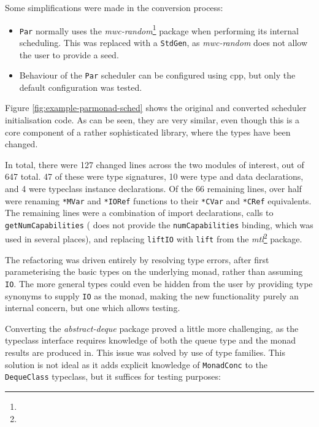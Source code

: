 Some simplifications were made in the conversion process:

\begin{itemize}
\item \verb|Par| normally uses the
  \emph{mwc-random}\footnote{} package when
  performing its internal scheduling. This was replaced with a
  \verb|StdGen|, as \emph{mwc-random} does not allow the user to
  provide a seed.

\item Behaviour of the \verb|Par| scheduler can be configured using
  cpp, but only the default configuration was tested.
\end{itemize}

Figure \ref{fig:example-parmonad-sched} shows the original and
converted scheduler initialisation code. As can be seen, they are very
similar, even though this is a core component of a rather
sophisticated library, where the types have been changed.

In total, there were 127 changed lines across the two modules of
interest, out of 647 total. 47 of these were type signatures, 10 were
type and data declarations, and 4 were typeclass instance
declarations. Of the 66 remaining lines, over half were renaming
\verb|*MVar| and \verb|*IORef| functions to their \verb|*CVar| and
\verb|*CRef| equivalents. The remaining lines were a combination of
import declarations, calls to \verb|getNumCapabilities| (\dejafu{}
does not provide the \verb|numCapabilities| binding, which was used in
several places), and replacing \verb|liftIO| with \verb|lift| from the
\emph{mtl}\footnote{} package.

The refactoring was driven entirely by resolving type errors, after
first parameterising the basic types on the underlying monad, rather
than assuming \verb|IO|. The more general types could even be hidden
from the user by providing type synonyms to supply \verb|IO| as the
monad, making the new functionality purely an internal concern, but
one which allows testing.

Converting the \emph{abstract-deque} package proved a little more
challenging, as the typeclass interface requires knowledge of both the
queue type and the monad results are produced in. This issue was
solved by use of type families. This solution is not ideal as it adds
explicit knowledge of \verb|MonadConc| to the \verb|DequeClass|
typeclass, but it suffices for testing purposes:


\FloatBarrier

